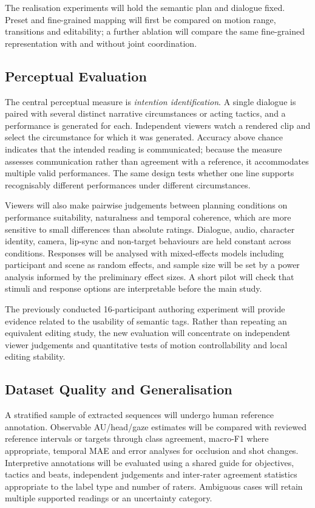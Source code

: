 \documentclass[11pt,a4paper]{article}
\begin{document}
The realisation experiments will hold the semantic plan and dialogue fixed. Preset and fine-grained mapping will first be compared on motion range, transitions and editability; a further ablation will compare the same fine-grained representation with and without joint coordination.

\subsection{Perceptual Evaluation}

The central perceptual measure is \emph{intention identification}. A single dialogue is paired with several distinct narrative circumstances or acting tactics, and a performance is generated for each. Independent viewers watch a rendered clip and select the circumstance for which it was generated. Accuracy above chance indicates that the intended reading is communicated; because the measure assesses communication rather than agreement with a reference, it accommodates multiple valid performances. The same design tests whether one line supports recognisably different performances under different circumstances.

Viewers will also make pairwise judgements between planning conditions on performance suitability, naturalness and temporal coherence, which are more sensitive to small differences than absolute ratings. Dialogue, audio, character identity, camera, lip-sync and non-target behaviours are held constant across conditions. Responses will be analysed with mixed-effects models including participant and scene as random effects, and sample size will be set by a power analysis informed by the preliminary effect sizes. A short pilot will check that stimuli and response options are interpretable before the main study.

The previously conducted 16-participant authoring experiment will provide evidence related to the usability of semantic tags. Rather than repeating an equivalent editing study, the new evaluation will concentrate on independent viewer judgements and quantitative tests of motion controllability and local editing stability.

\subsection{Dataset Quality and Generalisation}

A stratified sample of extracted sequences will undergo human reference annotation. Observable AU/head/gaze estimates will be compared with reviewed reference intervals or targets through class agreement, macro-F1 where appropriate, temporal MAE and error analyses for occlusion and shot changes. Interpretive annotations will be evaluated using a shared guide for objectives, tactics and beats, independent judgements and inter-rater agreement statistics appropriate to the label type and number of raters. Ambiguous cases will retain multiple supported readings or an uncertainty category.
\end{document}

